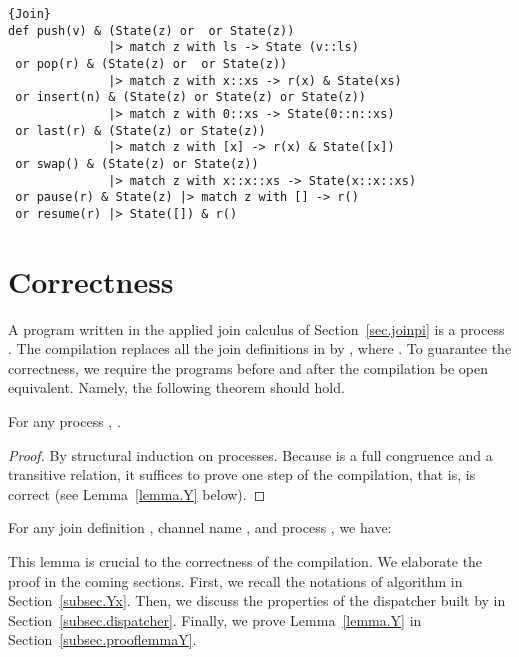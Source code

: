 \documentclass{LMCS}
\newcommand{\forget}[1]{}
\renewcommand{\_}{\mathord{\rule[-.25ex]{1ex}{.15ex}}}
\begin{document}
\begin{lstlisting}{Join}
def push(v) & (State(z) or  or State(z)) 
              |> match z with ls -> State (v::ls) 
 or pop(r) & (State(z) or  or State(z))
              |> match z with x::xs -> r(x) & State(xs)
 or insert(n) & (State(z) or State(z) or State(z))
              |> match z with 0::xs -> State(0::n::xs)
 or last(r) & (State(z) or State(z))
              |> match z with [x] -> r(x) & State([x])
 or swap() & (State(z) or State(z))
              |> match z with x::x::xs -> State(x::x::xs)
 or pause(r) & State(z) |> match z with [] -> r()
 or resume(r) |> State([]) & r()
\end{lstlisting}

\section{Correctness}
\label{sec.correct}

A program written in the applied join calculus of
Section~\ref{sec.joinpi} is a process . The compilation 
replaces all the join definitions  in  by , where . To guarantee the
correctness, we require the programs before and after the compilation
be open equivalent. Namely, the following theorem should hold.
\begin{thm}\label{th.joinpi.correct}
  For any process , .
\end{thm}
\begin{proof}
  By structural induction on processes. Because  is a full
  congruence and a transitive relation, it suffices to prove one step
  of the compilation, that is,  is correct (see
  Lemma~\ref{lemma.Y} below). \forget{\qed}
\end{proof}
\begin{lem}\label{lemma.Y}
  For any join definition , channel name , and
  process , we have:
  
\end{lem}
This lemma is crucial to the correctness of the compilation. \iffalse
The proof relies on the properties of the meet semi-lattice
constructed from the pattern arguments. In particular the proof
exploits the deterministic semantics of the ML pattern matching in the
dispatcher, which is built following the topological order of the
lattice. \fi We elaborate the proof in the coming sections.
First, we recall the notations of algorithm  in
Section~\ref{subsec.Yx}. Then, we discuss the properties of the
dispatcher built by  in Section~\ref{subsec.dispatcher}. Finally,
we prove Lemma~\ref{lemma.Y} in Section~\ref{subsec.prooflemmaY}.
\end{document}
